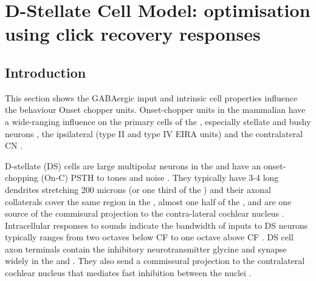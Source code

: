 
\section[DS Cell Model]{D-Stellate Cell Model: optimisation using click recovery
  responses}
\label{sec:d-stellate-cell-model}

\subsection{Introduction}

This section shows the GABAergic input and intrinsic cell properties influence
the behaviour Onset chopper units.  Onset-chopper units in the mammalian \VCN
have a wide-ranging influence on the primary cells of the \VCN, especially
stellate and bushy neurons \citep{RhodeSmithEtAl:1983}, the ipsilateral \DCN
(type II and type IV EIRA units) and the contra\-lateral CN
\citep{NeedhamPaolini:2007}.


  
D-stellate (DS) cells are large multipolar neurons in the \VCN and have an
onset-chopping (On-C) PSTH to tones and noise \citep{SmithRhode:1989,
  NeedhamPaolini:2006}.  They typically have 3-4 long dendrites stretching 200
microns (or one third of the \VCN) and their axonal collaterals cover the same
region in the \VCN, almost one half of the \DCN, and are one source of the
commisural projection to the contra-lateral cochlear nucleus
\citep{Cant:1992,Cant:1981,SchofieldCant:1996,CantBenson:2003,
  NeedhamPaolini:2007, PaoliniClark:1999}. Intracellular responses to sounds
indicate the bandwidth of inputs to DS neurons typically ranges from two octaves
below CF to one octave above CF \citep{PalmerJiangEtAl:1996,
  JiangPalmerEtAl:1996, PaoliniClark:1999}. DS cell axon terminals contain the
inhibitory neurotransmitter glycine and synapse widely in the \VCN and \DCN\@.
They also send a commissural projection to the contralateral cochlear nucleus
that mediates fast inhibition between the nuclei \citep{NeedhamPaolini:2003,
  NeedhamPaolini:2006, Oertel:1997}.

